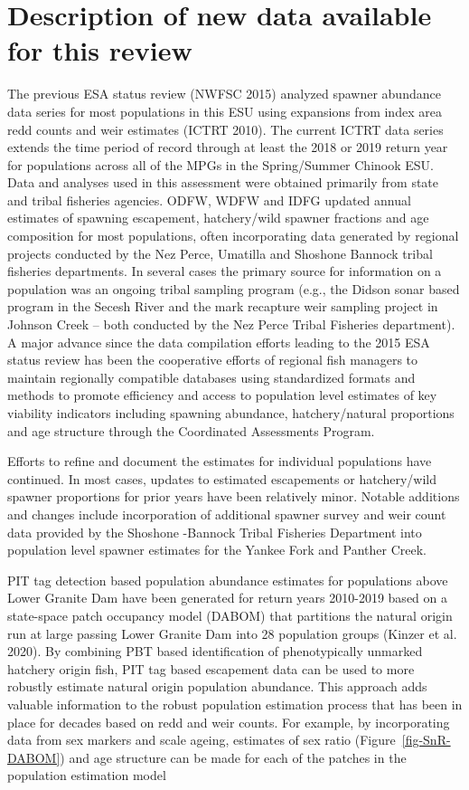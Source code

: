 \documentclass[
  letterpaper,
  oneside,
  open=any]{scrbook}
\begin{document}
\hypertarget{description-of-new-data-available-for-this-review-2}{%
\section{Description of new data available for this
review}\label{description-of-new-data-available-for-this-review-2}}

The previous ESA status review (NWFSC 2015) analyzed spawner abundance
data series for most populations in this ESU using expansions from index
area redd counts and weir estimates (ICTRT 2010). The current ICTRT data
series extends the time period of record through at least the 2018 or
2019 return year for populations across all of the MPGs in the
Spring/Summer Chinook ESU. Data and analyses used in this assessment
were obtained primarily from state and tribal fisheries agencies. ODFW,
WDFW and IDFG updated annual estimates of spawning escapement,
hatchery/wild spawner fractions and age composition for most
populations, often incorporating data generated by regional projects
conducted by the Nez Perce, Umatilla and Shoshone Bannock tribal
fisheries departments. In several cases the primary source for
information on a population was an ongoing tribal sampling program
(e.g., the Didson sonar based program in the Secesh River and the mark
recapture weir sampling project in Johnson Creek -- both conducted by
the Nez Perce Tribal Fisheries department). A major advance since the
data compilation efforts leading to the 2015 ESA status review has been
the cooperative efforts of regional fish managers to maintain regionally
compatible databases using standardized formats and methods to promote
efficiency and access to population level estimates of key viability
indicators including spawning abundance, hatchery/natural proportions
and age structure through the Coordinated Assessments Program.

Efforts to refine and document the estimates for individual populations
have continued. In most cases, updates to estimated escapements or
hatchery/wild spawner proportions for prior years have been relatively
minor. Notable additions and changes include incorporation of additional
spawner survey and weir count data provided by the Shoshone -Bannock
Tribal Fisheries Department into population level spawner estimates for
the Yankee Fork and Panther Creek.

PIT tag detection based population abundance estimates for populations
above Lower Granite Dam have been generated for return years 2010-2019
based on a state-space patch occupancy model (DABOM) that partitions the
natural origin run at large passing Lower Granite Dam into 28 population
groups (Kinzer et al. 2020). By combining PBT based identification of
phenotypically unmarked hatchery origin fish, PIT tag based escapement
data can be used to more robustly estimate natural origin population
abundance. This approach adds valuable information to the robust
population estimation process that has been in place for decades based
on redd and weir counts. For example, by incorporating data from sex
markers and scale ageing, estimates of sex ratio
(Figure~\ref{fig-SnR-DABOM}) and age structure can be made for each of
the patches in the population estimation model
\end{document}
